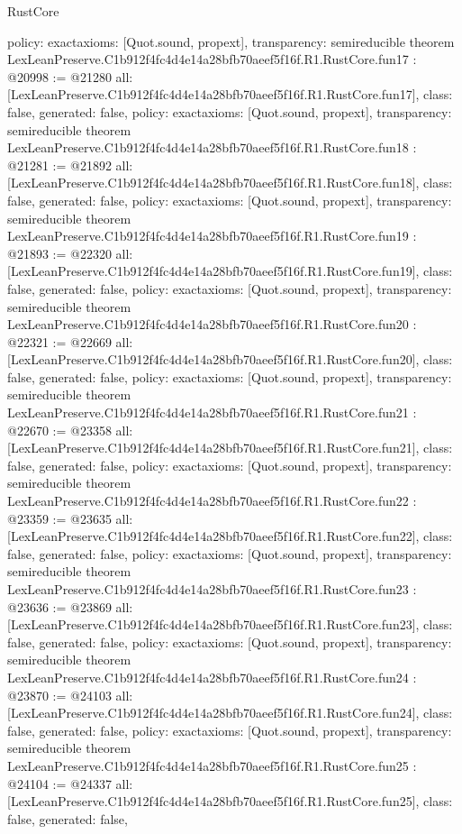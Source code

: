 \begin{lexlean}{RustCore}
\begin{coremodule}
{  policy: exact{axioms: [Quot.sound, propext]},
  transparency: semireducible
}
theorem LexLeanPreserve.C1b912f4fc4d4e14a28bfb70aeef5f16f.R1.RustCore.fun17 : @20998 := @21280 {
  all: [LexLeanPreserve.C1b912f4fc4d4e14a28bfb70aeef5f16f.R1.RustCore.fun17],
  class: false,
  generated: false,
  policy: exact{axioms: [Quot.sound, propext]},
  transparency: semireducible
}
theorem LexLeanPreserve.C1b912f4fc4d4e14a28bfb70aeef5f16f.R1.RustCore.fun18 : @21281 := @21892 {
  all: [LexLeanPreserve.C1b912f4fc4d4e14a28bfb70aeef5f16f.R1.RustCore.fun18],
  class: false,
  generated: false,
  policy: exact{axioms: [Quot.sound, propext]},
  transparency: semireducible
}
theorem LexLeanPreserve.C1b912f4fc4d4e14a28bfb70aeef5f16f.R1.RustCore.fun19 : @21893 := @22320 {
  all: [LexLeanPreserve.C1b912f4fc4d4e14a28bfb70aeef5f16f.R1.RustCore.fun19],
  class: false,
  generated: false,
  policy: exact{axioms: [Quot.sound, propext]},
  transparency: semireducible
}
theorem LexLeanPreserve.C1b912f4fc4d4e14a28bfb70aeef5f16f.R1.RustCore.fun20 : @22321 := @22669 {
  all: [LexLeanPreserve.C1b912f4fc4d4e14a28bfb70aeef5f16f.R1.RustCore.fun20],
  class: false,
  generated: false,
  policy: exact{axioms: [Quot.sound, propext]},
  transparency: semireducible
}
theorem LexLeanPreserve.C1b912f4fc4d4e14a28bfb70aeef5f16f.R1.RustCore.fun21 : @22670 := @23358 {
  all: [LexLeanPreserve.C1b912f4fc4d4e14a28bfb70aeef5f16f.R1.RustCore.fun21],
  class: false,
  generated: false,
  policy: exact{axioms: [Quot.sound, propext]},
  transparency: semireducible
}
theorem LexLeanPreserve.C1b912f4fc4d4e14a28bfb70aeef5f16f.R1.RustCore.fun22 : @23359 := @23635 {
  all: [LexLeanPreserve.C1b912f4fc4d4e14a28bfb70aeef5f16f.R1.RustCore.fun22],
  class: false,
  generated: false,
  policy: exact{axioms: [Quot.sound, propext]},
  transparency: semireducible
}
theorem LexLeanPreserve.C1b912f4fc4d4e14a28bfb70aeef5f16f.R1.RustCore.fun23 : @23636 := @23869 {
  all: [LexLeanPreserve.C1b912f4fc4d4e14a28bfb70aeef5f16f.R1.RustCore.fun23],
  class: false,
  generated: false,
  policy: exact{axioms: [Quot.sound, propext]},
  transparency: semireducible
}
theorem LexLeanPreserve.C1b912f4fc4d4e14a28bfb70aeef5f16f.R1.RustCore.fun24 : @23870 := @24103 {
  all: [LexLeanPreserve.C1b912f4fc4d4e14a28bfb70aeef5f16f.R1.RustCore.fun24],
  class: false,
  generated: false,
  policy: exact{axioms: [Quot.sound, propext]},
  transparency: semireducible
}
theorem LexLeanPreserve.C1b912f4fc4d4e14a28bfb70aeef5f16f.R1.RustCore.fun25 : @24104 := @24337 {
  all: [LexLeanPreserve.C1b912f4fc4d4e14a28bfb70aeef5f16f.R1.RustCore.fun25],
  class: false,
  generated: false,
}
\end{coremodule}
\end{lexlean}
